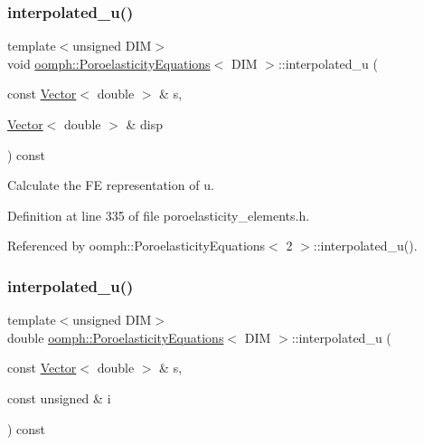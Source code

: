 \subsubsection{\texorpdfstring{interpolated\+\_\+u()}{interpolated\_u()}\hspace{0.1cm}{\footnotesize\ttfamily [1/2]}}
{\footnotesize\ttfamily template$<$unsigned D\+IM$>$ \\
void \hyperlink{classoomph_1_1PoroelasticityEquations}{oomph\+::\+Poroelasticity\+Equations}$<$ D\+IM $>$\+::interpolated\+\_\+u (\begin{DoxyParamCaption}\item[{const \hyperlink{classoomph_1_1Vector}{Vector}$<$ double $>$ \&}]{s,  }\item[{\hyperlink{classoomph_1_1Vector}{Vector}$<$ double $>$ \&}]{disp }\end{DoxyParamCaption}) const\hspace{0.3cm}{\ttfamily [inline]}}



Calculate the FE representation of u. 



Definition at line 335 of file poroelasticity\+\_\+elements.\+h.



Referenced by oomph\+::\+Poroelasticity\+Equations$<$ 2 $>$\+::interpolated\+\_\+u().

\mbox{\label{classoomph_1_1PoroelasticityEquations_a252bb0aa85c006d1a69b60df24d8a206}} 
\subsubsection{\texorpdfstring{interpolated\+\_\+u()}{interpolated\_u()}\hspace{0.1cm}{\footnotesize\ttfamily [2/2]}}
{\footnotesize\ttfamily template$<$unsigned D\+IM$>$ \\
double \hyperlink{classoomph_1_1PoroelasticityEquations}{oomph\+::\+Poroelasticity\+Equations}$<$ D\+IM $>$\+::interpolated\+\_\+u (\begin{DoxyParamCaption}\item[{const \hyperlink{classoomph_1_1Vector}{Vector}$<$ double $>$ \&}]{s,  }\item[{const unsigned \&}]{i }\end{DoxyParamCaption}) const\hspace{0.3cm}{\ttfamily [inline]}}



